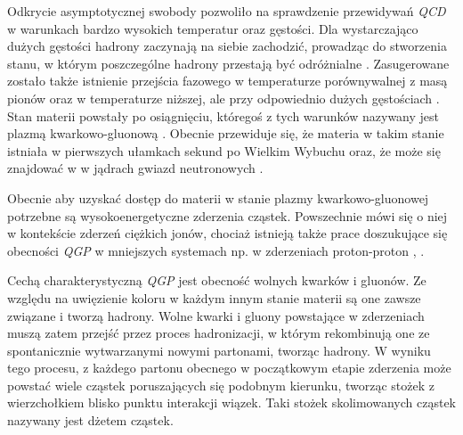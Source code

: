 Odkrycie asymptotycznej swobody pozwoliło na sprawdzenie przewidywań \textit{QCD} w warunkach bardzo wysokich temperatur oraz gęstości. 
Dla wystarczająco dużych gęstości hadrony zaczynają na siebie zachodzić, prowadząc do stworzenia stanu, w którym poszczególne hadrony przestają być odróżnialne \cite{Collins:1974ky}. 
Zasugerowane zostało także istnienie przejścia fazowego w temperaturze porównywalnej z masą pionów oraz w temperaturze niższej, ale przy odpowiednio dużych gęstościach \cite{Cabibbo:1975ig}. Stan materii powstały po osiągnięciu, któregoś z tych warunków nazywany jest plazmą kwarkowo-gluonową .
Obecnie przewiduje się, że materia w takim stanie istniała w pierwszych ułamkach sekund po Wielkim Wybuchu \cite{Boyanovsky:2006bf} oraz, że może się znajdować w w jądrach gwiazd neutronowych \cite{Alford:2013pma}.

Obecnie aby uzyskać dostęp do materii w stanie plazmy kwarkowo-gluonowej potrzebne są wysokoenergetyczne zderzenia cząstek. Powszechnie mówi się o niej w kontekście zderzeń ciężkich jonów, chociaż istnieją także prace doszukujące się obecności \textit{QGP} w mniejszych systemach np. w zderzeniach proton-proton \cite{Khachatryan:2016txc}, \cite{ALICE:2017jyt}. 

Cechą charakterystyczną \textit{QGP} jest obecność wolnych kwarków i gluonów. Ze względu na uwięzienie koloru w każdym innym stanie materii są one zawsze związane i tworzą hadrony. 
Wolne kwarki i gluony powstające w zderzeniach muszą zatem przejść przez proces hadronizacji, w którym  rekombinują one ze spontanicznie wytwarzanymi nowymi partonami, tworząc hadrony. W wyniku tego procesu, z każdego partonu obecnego w początkowym etapie zderzenia może powstać wiele cząstek poruszających się podobnym kierunku, tworząc stożek z wierzchołkiem blisko punktu interakcji wiązek. Taki stożek skolimowanych cząstek nazywany jest dżetem cząstek.




